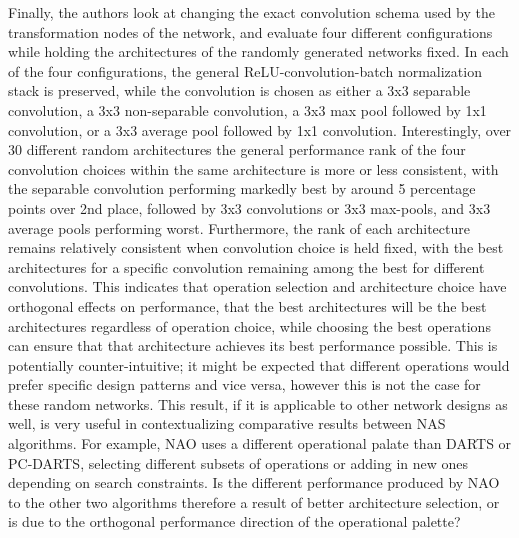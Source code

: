 Finally, the authors look at changing the exact convolution schema used by the transformation nodes of the network, and evaluate
four different configurations while holding the architectures of the randomly generated networks fixed. In each of the four
configurations, the general ReLU-convolution-batch normalization stack is preserved, while the convolution is chosen
as either a 3x3 separable convolution, a 3x3 non-separable convolution, a 3x3 max pool followed by 1x1 convolution, or
a 3x3 average pool followed by 1x1 convolution. Interestingly, over 30 different random architectures the general performance
rank of the four convolution choices within the same architecture is more or less consistent,
with the separable convolution performing markedly best by around 5 percentage points over 2nd place, followed by 3x3
convolutions or 3x3 max-pools, and 3x3 average pools performing worst. Furthermore, the rank of each architecture
remains relatively consistent when convolution choice is held fixed, with the best architectures for a specific convolution
remaining among the best for different convolutions. This indicates that operation selection and architecture choice have
orthogonal effects on performance, that the best architectures will be the best architectures regardless of operation choice,
while choosing the best operations can ensure that that architecture achieves its best performance possible. This is
potentially counter-intuitive; it might be expected that different operations would prefer
specific design patterns and vice versa, however this is not the case for these random networks. This result, if it
is applicable to other network designs as well, is very useful in contextualizing comparative results between NAS algorithms.
For example, NAO uses a different operational palate than DARTS or PC-DARTS, selecting different subsets of operations
or adding in new ones depending on search constraints. Is the different performance produced by NAO to the other two algorithms
therefore a result of better architecture selection, or is due to the orthogonal performance direction of the operational palette?


